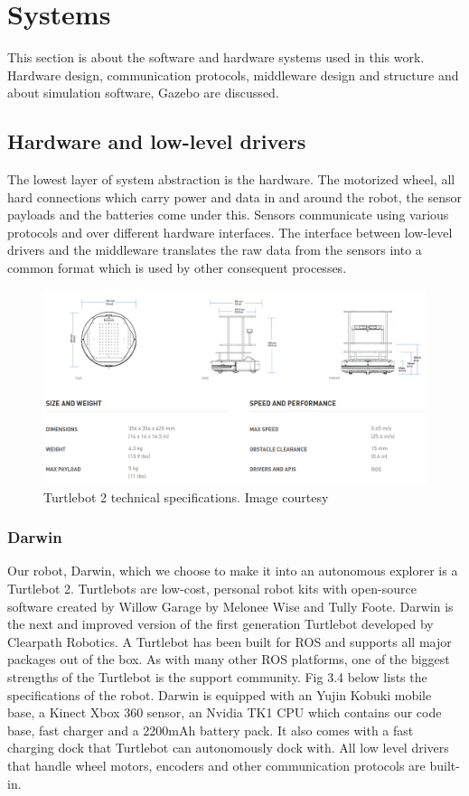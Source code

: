 
\section{Systems}
This section is about the software and hardware systems used in this work. Hardware design, communication protocols, middleware design and structure and about simulation software, Gazebo are discussed.  

\subsection{Hardware and low-level drivers}
The lowest layer of system abstraction is the hardware. The motorized wheel, all hard connections which carry power and data in and around the robot, the sensor payloads and the batteries come under this.
Sensors communicate using various protocols and over different hardware interfaces. The interface between low-level drivers and the middleware translates the raw data from the sensors into a common format which is used by other consequent processes.

\begin{figure}[!b]
    \centering
    \includegraphics[width=\textwidth]{images/botspecs.png}
    \caption{Turtlebot 2 technical specifications. Image courtesy \cite{41}}
    \label{fig:tb}
\end{figure}

\subsubsection{Darwin}
Our robot, Darwin, which we choose to make it into an autonomous explorer is a Turtlebot 2. Turtlebots are low-cost, personal robot kits with open-source software created by Willow Garage by Melonee Wise and Tully Foote\cite{32}. Darwin is the next and improved version of the first generation Turtlebot developed by Clearpath Robotics. A Turtlebot has been built for ROS and supports all major packages out of the box. As with many other ROS platforms, one of the biggest strengths of the Turtlebot is the support community. Fig 3.4 below lists the specifications of the robot. Darwin is equipped with an Yujin Kobuki mobile base, a Kinect Xbox 360 sensor, an Nvidia TK1 CPU which contains our code base, fast charger and a 2200mAh battery pack. It also comes with a fast charging dock that Turtlebot can autonomously dock with. All low level drivers that handle wheel motors, encoders and other communication protocols are built-in.

